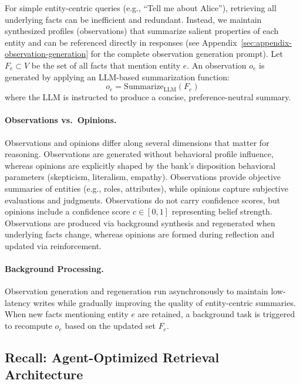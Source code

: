 For simple entity-centric queries (e.g., ``Tell me about Alice''), retrieving all underlying facts can be inefficient and redundant. Instead, we maintain synthesized profiles (observations) that summarize salient properties of each entity and can be referenced directly in responses (see Appendix~\ref{sec:appendix-observation-generation} for the complete observation generation prompt). Let $F_e \subset V$ be the set of all facts that mention entity $e$. An observation $o_e$ is generated by applying an LLM-based summarization function:
\begin{equation}
o_e = \text{Summarize}_{\text{LLM}}(F_e)
\end{equation}
where the LLM is instructed to produce a concise, preference-neutral summary.

\paragraph{Observations vs.\ Opinions.}

Observations and opinions differ along several dimensions that matter for reasoning. Observations are generated without behavioral profile influence, whereas opinions are explicitly shaped by the bank's disposition behavioral parameters (skepticism, literalism, empathy). Observations provide objective summaries of entities (e.g., roles, attributes), while opinions capture subjective evaluations and judgments. Observations do not carry confidence scores, but opinions include a confidence score $c \in [0,1]$ representing belief strength. Observations are produced via background synthesis and regenerated when underlying facts change, whereas opinions are formed during reflection and updated via reinforcement.

\paragraph{Background Processing.}

Observation generation and regeneration run asynchronously to maintain low-latency writes while gradually improving the quality of entity-centric summaries. When new facts mentioning entity $e$ are retained, a background task is triggered to recompute $o_e$ based on the updated set $F_e$.

\subsection{Recall: Agent-Optimized Retrieval Architecture}
\label{sec:tempr-recall}

